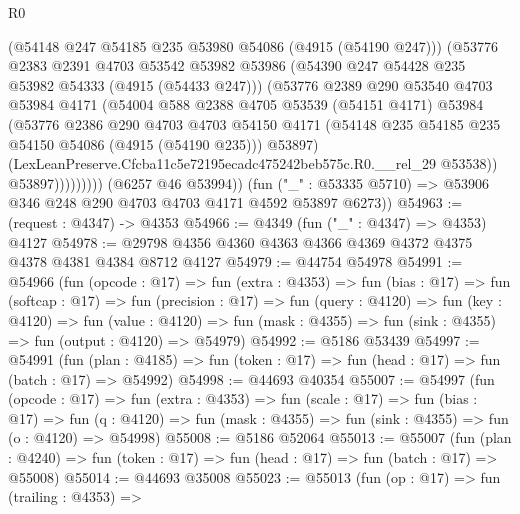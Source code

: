 \begin{lexlean}{R0}
\begin{coremodule}
                      (@54148 @247 @54185 @235 @53980 @54086 (@4915 (@54190 @247)))
                      (@53776
                        @2383
                        @2391
                        @4703
                        @53542
                        @53982
                        @53986
                        (@54390 @247 @54428 @235 @53982 @54333 (@4915 (@54433 @247)))
                        (@53776
                          @2389
                          @290
                          @53540
                          @4703
                          @53984
                          @4171
                          (@54004
                            @588
                            @2388
                            @4705
                            @53539
                            (@54151 @4171)
                            @53984
                            (@53776
                              @2386
                              @290
                              @4703
                              @4703
                              @54150
                              @4171
                              (@54148 @235 @54185 @235 @54150 @54086 (@4915 (@54190 @235)))
                              @53897)
                            (LexLeanPreserve.Cfcba11c5e72195ecadc475242beb575c.R0.__rel_29 @53538))
                          @53897)))))))))
        (@6257 @46 @53994))
      (fun ("_" : @53335 @5710) => @53906 @346 @248 @290 @4703 @4703 @4171 @4592 @53897 @6273))
@54963 := (request : @4347) -> @4353
@54966 := @4349 (fun ("_" : @4347) => @4353) @4127
@54978 := @29798 @4356 @4360 @4363 @4366 @4369 @4372 @4375 @4378 @4381 @4384 @8712 @4127
@54979 := @44754 @54978
@54991 := @54966
    (fun (opcode : @17) =>
    fun (extra : @4353) =>
    fun (bias : @17) =>
    fun (softcap : @17) =>
    fun (precision : @17) =>
    fun (query : @4120) =>
    fun (key : @4120) =>
    fun (value : @4120) =>
    fun (mask : @4355) => fun (sink : @4355) => fun (output : @4120) => @54979)
@54992 := @5186 @53439
@54997 := @54991
    (fun (plan : @4185) => fun (token : @17) => fun (head : @17) => fun (batch : @17) => @54992)
@54998 := @44693 @40354
@55007 := @54997
    (fun (opcode : @17) =>
    fun (extra : @4353) =>
    fun (scale : @17) =>
    fun (bias : @17) =>
    fun (q : @4120) => fun (mask : @4355) => fun (sink : @4355) => fun (o : @4120) => @54998)
@55008 := @5186 @52064
@55013 := @55007
    (fun (plan : @4240) => fun (token : @17) => fun (head : @17) => fun (batch : @17) => @55008)
@55014 := @44693 @35008
@55023 := @55013
    (fun (op : @17) =>
    fun (trailing : @4353) =>

\end{coremodule}
\end{lexlean}
